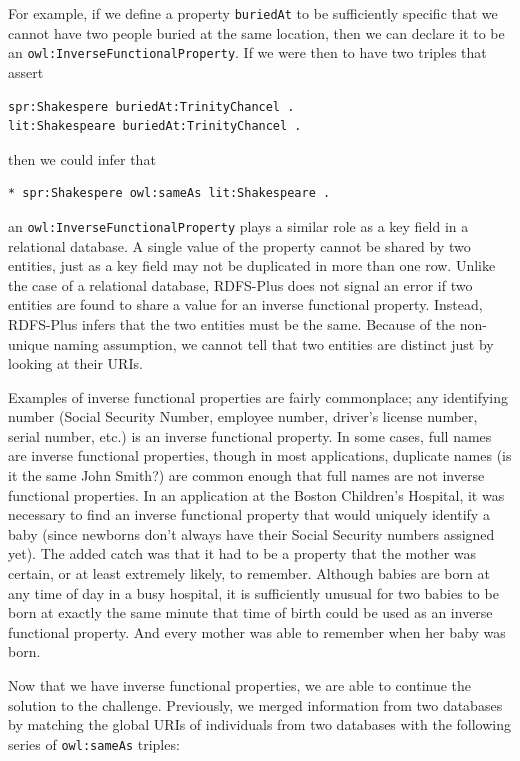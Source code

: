 For example, if we define a property \texttt{buriedAt} to be sufficiently
specific that we cannot have two people buried at the same location,
then we can declare it to be an \texttt{owl:InverseFunctionalProperty}. If we
were then to have two triples that assert

\begin{lstlisting}
spr:Shakespere buriedAt:TrinityChancel .
lit:Shakespeare buriedAt:TrinityChancel .
\end{lstlisting}

then we could infer that

\begin{lstlisting}
* spr:Shakespere owl:sameAs lit:Shakespeare .
\end{lstlisting}

an \texttt{owl:InverseFunctionalProperty} plays a similar role as a key field in
a relational database. A single value of the property cannot be shared
by two entities, just as a key field may not be
duplicated in more than one row. Unlike the case of a relational
database, RDFS-Plus does not signal an error if two entities are found
to share a value for an inverse functional property. Instead, RDFS-Plus
infers that the two entities must be the same. Because of the non-unique
naming assumption, we cannot tell that two entities are distinct just by
looking at their URIs.

Examples of inverse functional properties are fairly commonplace; any
identifying number (Social Security Number, employee number, driver's
license number, serial number, etc.) is an inverse functional property.
In some cases, full names are inverse functional properties, though in
most applications, duplicate names (is it the same John Smith?) are
common enough that full names are not inverse functional properties. In
an application at the Boston Children's Hospital, it was necessary to
find an inverse functional property that would uniquely identify a baby
(since newborns don't always have their Social Security numbers assigned
yet). The added catch was that it had to be a property that the mother
was certain, or at least extremely likely, to remember. Although babies
are born at any time of day in a busy hospital, it is sufficiently
unusual for two babies to be born at exactly the same minute that time
of birth could be used as an inverse functional property. And every
mother was able to remember when her baby was born.

Now that we have inverse functional properties, we are able to continue
the solution to the challenge. Previously, we merged information from
two databases by matching the global URIs of individuals from two
databases with the following series of \texttt{owl:sameAs} triples:

